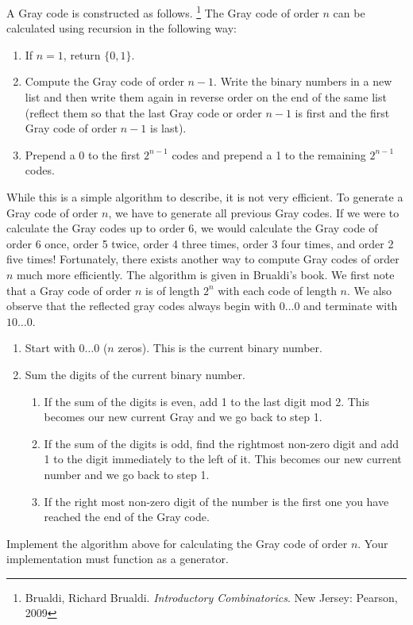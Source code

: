 A Gray code is constructed as follows.
\footnote{Brualdi, Richard Brualdi. \emph{Introductory Combinatorics}. New Jersey: Pearson, 2009}
The Gray code of order $n$ can be calculated using recursion in the following way:
\begin{enumerate}
\item If $n=1$, return $\lbrace 0, 1\rbrace$.
\item Compute the Gray code of order $n-1$.  Write the binary numbers in a new list and then write them again in reverse order on the end of the same list (reflect them so that the last Gray code or order $n-1$ is first and the first Gray code of order $n-1$ is last).
\item Prepend a 0 to the first $2^{n-1}$ codes and prepend a 1 to the remaining $2^{n-1}$ codes.
\end{enumerate}
While this is a simple algorithm to describe, it is not very efficient.  
To generate a Gray code of order $n$, we have to generate all previous Gray codes.
If we were to calculate the Gray codes up to order 6, we would calculate the Gray code of order 6 once, order 5 twice, order 4 three times, order 3 four times, and order 2 five times!
Fortunately, there exists another way to compute Gray codes of order $n$ much more efficiently.
The algorithm is given in Brualdi's book.  
We first note that a Gray code of order $n$ is of length $2^n$ with each code of length $n$.
We also observe that the reflected gray codes always begin with $0\dots0$ and terminate with $10\dots0$.
\begin{enumerate}
\item Start with $0\dots0$ ($n$ zeros).  This is the current binary number.
\item Sum the digits of the current binary number.
\begin{enumerate}
\item If the sum of the digits is even, add 1 to the last digit mod 2.
This becomes our new current Gray and we go back to step 1.
\item If the sum of the digits is odd, find the rightmost non-zero digit and add 1 to the digit immediately to the left of it.
This becomes our new current number and we go back to step 1.
\item If the right most non-zero digit of the number is the first one you have reached the end of the Gray code.
\end{enumerate}
\end{enumerate}

\begin{problem}
\label{prob:brualdi_gray}
Implement the algorithm above for calculating the Gray code of order $n$.
Your implementation must function as a generator.
\end{problem}

